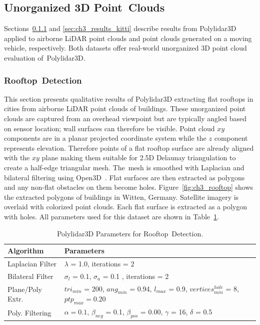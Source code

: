 \subsection{Unorganized 3D Point~Clouds}\label{sec:ch3_results_unorganized}

Sections~\ref{sec:ch3_results_rooftop} and \ref{sec:ch3_results_kitti} describe results from Polylidar3D applied to airborne LiDAR point clouds and point clouds generated on a moving vehicle, respectively.  Both datasets offer real-world unorganized 3D point cloud evaluation of~Polylidar3D.

\subsubsection{Rooftop~Detection} \label{sec:ch3_results_rooftop}


This section presents qualitative results of Polylidar3D extracting flat rooftops in cities from airborne LiDAR point clouds of buildings. These unorganized point clouds are captured from an overhead viewpoint but are typically angled based on sensor location; wall surfaces can therefore be visible. Point cloud $xy$ components are in a planar projected coordinate system while the $z$ component represents elevation. Therefore points of a flat rooftop surface are already aligned with the $xy$ plane making them suitable for 2.5D Delaunay triangulation to create a half-edge triangular mesh.  The~mesh is smoothed with Laplacian and bilateral filtering using Open3D~\cite{zhou_open3d_2018}. Flat surfaces are then extracted as polygons and any non-flat obstacles on them become holes. Figure~\ref{fig:ch3_rooftop} shows the extracted polygons of buildings in Witten, Germany. Satellite imagery is overlaid with colorized point clouds. %
Each flat surface is extracted as a polygon with holes. 
All parameters used for this dataset are shown in Table~\ref{table:ch3_rooftop_parameters}. 


\begin{table}[H]
\centering
\caption{Polylidar3D Parameters for Rooftop~Detection.}\label{table:ch3_rooftop_parameters}
\begin{tabular}{@{}ll@{}}
\toprule
\textbf{Algorithm}        & \textbf{Parameters}                                                          \\ \midrule
Laplacian Filter & $\lambda$ = 1.0, iterations = 2   \\
Bilateral Filter & $\sigma_l$ = 0.1, $\sigma_a$ = 0.1 , iterations = 2 \\
Plane/Poly Extr.      & $tri_{min}$ = 200, $ang_{min}$ = 0.94, $l_{max}$ = 0.9, $vertices^{hole}_{min}$ = 8, $ptp_{max} = 0.20$     \\
Poly. Filtering      & $\alpha = 0.1$, $\beta_{neg}$ = 0.1, $\beta_{pos}$ = 0.00, $\gamma$ = 16, $\delta$ = 0.5  \\ \bottomrule
\end{tabular}
\end{table}


